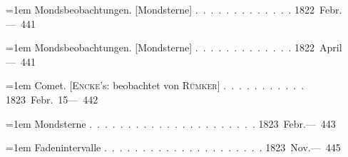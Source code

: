 \noindent\hangindent=1em Mondsbeobachtungen. [Mondsterne] \mbox{.\ .\ .\ .\ .\ .\ .\ .\ .\ .\ .\ .\ .} \hfill\mbox{1822 Febr.}\quad\mbox{--- 441}\par\smallskip
\noindent\hangindent=1em Mondsbeobachtungen. [Mondsterne] \mbox{.\ .\ .\ .\ .\ .\ .\ .\ .\ .\ .\ .\ .} \hfill\mbox{1822 April}\quad\mbox{--- 441}\par\smallskip
\noindent\hangindent=1em Comet. [\textsc{Encke}'s: beobachtet von \textsc{Rümker}] \mbox{.\ .\ .\ .\ .\ .\ .\ .\ .\ .\ .} \hfill\mbox{1823 Febr. 15}\quad\mbox{--- 442}\par\smallskip
\noindent\hangindent=1em Mondsterne \mbox{.\ .\ .\ .\ .\ .\ .\ .\ .\ .\ .\ .\ .\ .\ .\ .\ .\ .\ .\ .\ .\ .} \hfill\mbox{1823 Febr.}\quad\mbox{--- 443}\par\smallskip
\noindent\hangindent=1em Fadenintervalle \mbox{.\ .\ .\ .\ .\ .\ .\ .\ .\ .\ .\ .\ .\ .\ .\ .\ .\ .\ .\ .\ .} \hfill\mbox{1823 Nov.}\quad\mbox{--- 445}\par\smallskip
\endgroup
